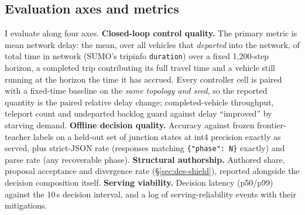 \subsection{Evaluation axes and metrics}\label{sec:met-metrics}
I evaluate along four axes. \textbf{Closed-loop control quality.} The
primary metric is mean network delay: the mean, over all vehicles that
\emph{departed} into the network, of total time in network (SUMO's
tripinfo \texttt{duration}) over a fixed 1,200-step horizon, a completed
trip contributing its full travel time and a vehicle still running at the
horizon the time it has accrued. Every controller cell is paired with a
fixed-time baseline on the \emph{same topology and seed}, so the reported
quantity is the paired relative delay change; completed-vehicle
throughput, teleport count and undeparted backlog guard against delay
``improved'' by starving demand. \textbf{Offline decision quality.}
Accuracy against frozen frontier-teacher labels on a held-out set of
junction states at int4 precision exactly as served, plus strict-JSON rate
(responses matching \texttt{\{"phase": N\}} exactly) and parse rate (any
recoverable phase). \textbf{Structural authorship.} Authored share,
proposal acceptance and divergence rate (\S\ref{sec:des-shield}), reported
alongside the decision composition itself. \textbf{Serving viability.}
Decision latency (p50/p99) against the 10\,s decision interval, and a log
of serving-reliability events with their mitigations.
